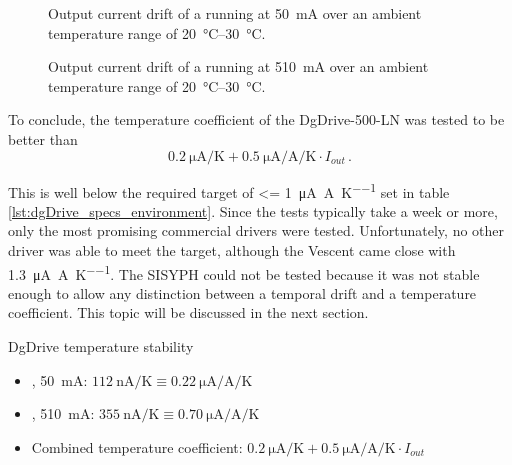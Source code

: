 \begin{figure}[hp]
    \centering
    
    \caption{Output current drift of a  running at \qty{50}{\mA} over an ambient temperature range of \qtyrange[range-units = single, range-phrase={~to~}]{20}{30}{\celsius}.}
    \label{fig:dgDrive_tempco_50mA}
\end{figure}
\begin{figure}[hp]
    \centering
    
    \caption{Output current drift of a  running at \qty{510}{\mA} over an ambient temperature range of \qtyrange[range-units = single, range-phrase={~to~}]{20}{30}{\celsius}.}
    \label{fig:dgDrive_tempco_510mA}
\end{figure}
\clearpage

To conclude, the temperature coefficient of the {DgDrive-500-LN} was tested to be better than
\begin{equation}
    \qty{0.2}{\uA \per \K} + \qty{0.5}{\uA \per \A \per \K} \cdot I_{out}\,.
\end{equation}

This is well below the required target of \qty{<= 1}{\uA \per \A \per \K} set in table \ref{lst:dgDrive_specs_environment}. Since the tests typically take a week or more, only the most promising commercial drivers were tested. Unfortunately, no other driver was able to meet the target, although the Vescent  came close with \qty{1.3}{\uA \per \A \per \K}. The SISYPH  could not be tested because it was not stable enough to allow any distinction between a temporal drift and a temperature coefficient. This topic will be discussed in the next section.
\begin{center}
    \begin{deviceProperties}[label={lst:dgDrive_temperature_stability}]{DgDrive temperature stability}
    \begin{itemize}
        \item {}, \qty{50}{\mA}: $\qty{112}{\nA \per \K} \equiv \qty{0.22}{\uA \per \A \per \K}$
        \item {}, \qty{510}{\mA}: $\qty{355}{\nA \per \K} \equiv \qty{0.70}{\uA \per \A \per \K}$
        \item Combined temperature coefficient: $\qty{0.2}{\uA \per \K} + \qty{0.5}{\uA \per \A \per \K} \cdot I_{out}$
    \end{itemize}
    \end{deviceProperties}
\end{center}

